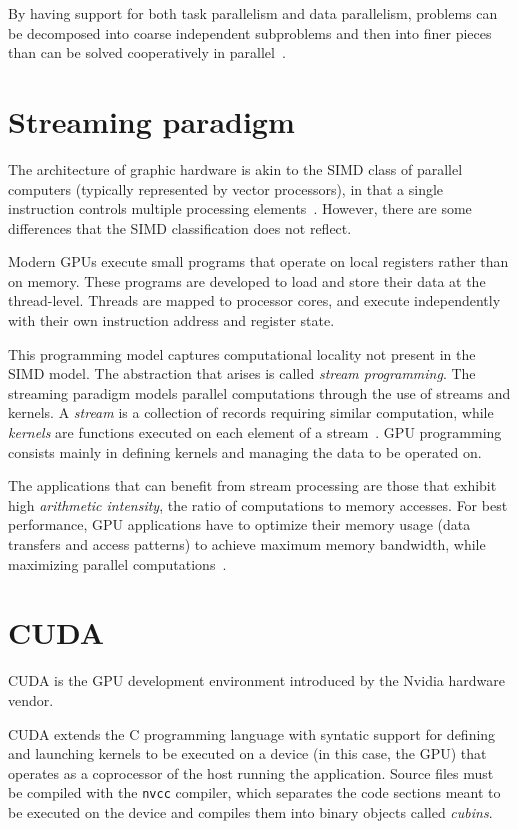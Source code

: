 By having support for both task parallelism and data parallelism,
problems can be decomposed into coarse independent subproblems
and then into finer pieces
than can be solved cooperatively in parallel~\cite[\S1.1]{cudaprog2}.

\section{Streaming paradigm}

The architecture of graphic hardware
is akin to the SIMD class of parallel computers
(typically represented by vector processors),
in that a single instruction controls multiple processing elements~\cite[\S3.1]{cudaprog2}.
However, there are some differences that the SIMD classification does not reflect.

Modern GPUs execute small programs that operate on local registers rather than on memory.
These programs are developed to load and store their data at the thread-level.
Threads are mapped to processor cores, and execute independently
with their own instruction address and register state.

This programming model captures computational locality not present in the SIMD model.
The abstraction that arises is called \emph{stream programming}.
The streaming paradigm models parallel computations through the use of streams and kernels.
A \emph{stream} is a collection of records requiring similar computation,
while \emph{kernels} are functions executed on each element of a stream~\cite[\S2.1]{buck04}.
GPU programming consists mainly in defining kernels
and managing the data to be operated on.

The applications that can benefit from stream processing
are those that exhibit high \emph{arithmetic intensity},
the ratio of computations to memory accesses.
For best performance,
GPU applications have to optimize their memory usage
(data transfers and access patterns)
to achieve maximum memory bandwidth,
while maximizing parallel computations~\cite[\S5.5]{cudaprog2}.

\section{CUDA}

CUDA is the GPU development environment
introduced by the Nvidia hardware vendor.

CUDA extends the C programming language
with syntatic support for defining and launching kernels
to be executed on a device (in this case, the GPU)
that operates as a coprocessor of the host running the application.
Source files must be compiled with the \texttt{nvcc} compiler,
which separates the code sections meant to be executed on the device
and compiles them into binary objects called \emph{cubins}.

